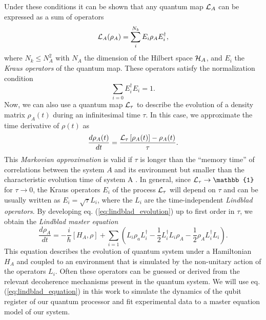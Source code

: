 Under these conditions it can be shown that any quantum map $\LA{A}$ can be expressed as a sum of operators \citep{kraus_states_1983}
%
\begin{equation}
\LA{A}(\rho_A) = \sum\limits_i^{N_k} E_i \rho_A E_i^\dagger, \label{eq:kraus_representation}
\end{equation}
%
where $N_k \le N_A^2$ with $N_A$ the dimension of the Hilbert space $\begin{mathcal}H\end{mathcal}_A$, and $E_i$ the {\it Kraus operators} of the quantum map. These operators satisfy the normalization condition
%
\begin{equation}
\sum\limits_{i=0} E_i^\dagger E_i = \mathrm{1}.
\end{equation}
%
Now, we can also use a quantum map $\LA{\tau}$ to describe the evolution of a density matrix $\rho_A(t)$ during an infinitesimal time $\tau$. In this case, we approximate the time derivative of $\rho(t)$ as
%
\begin{equation}
\frac{d\rho_A(t)}{dt}=\frac{\LA{\tau}\left[\rho_A(t)\right]-\rho_A(t)}{\tau}. \label{eq:lindblad_evolution}
\end{equation}
%
This {\it Markovian approximation} is valid if $\tau$ is longer than the ``memory time'' of correlations between the system $A$ and its environment but smaller than the characteristic evolution time of system A \citep{haroche_exploring_2006}. In general, since $\LA{\tau}\to \mathbb{1}$ for $\tau\to 0$, the Kraus operators $E_i$ of the process $\LA{\tau}$ will depend on $\tau$ and can be usually written as $E_i = \sqrt{\tau} L_i$, where the $L_i$ are the time-independent {\it Lindblad operators}. By developing eq. (\ref{eq:lindblad_evolution}) up to first order in $\tau$, we obtain the {\it Lindblad master equation}
%
\begin{equation}
\frac{d\rho_A}{dt} = -\frac{i}{\hbar}[H_A,\rho]+\sum\limits_{i = 1}\left(L_i\rho_aL_i^\dagger-\frac{1}{2}L_i^\dagger L_i\rho_A-\frac{1}{2}\rho_A L_i^\dagger L_i\right). \label{eq:lindblad_equation}
\end{equation}
%
This equation describes the evolution of quantum system under a Hamiltonian $H_A$ and coupled to an environment that is simulated by the non-unitary action of the operators $L_i$. Often these operators can be guessed or derived from the relevant decoherence mechanisms present in the quantum system. We will use eq. (\ref{eq:lindblad_equation}) in this work to simulate the dynamics of the qubit register of our quantum processor and fit experimental data to a master equation model of our system.

